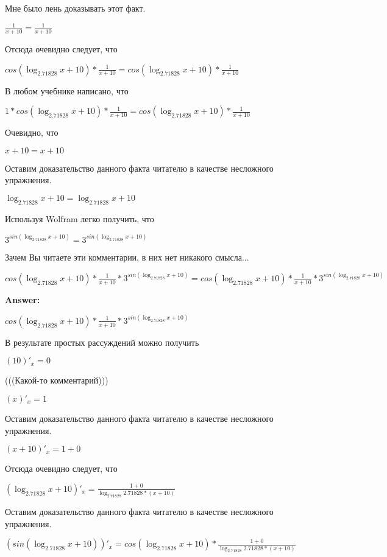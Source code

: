 \documentclass[12pt,a4paper,fleqn]{article}
\theoremstyle{definition}
\begin{document}
Мне было лень доказывать этот факт.

$\frac{ 1 }{ x  +  10 }
 = \frac{ 1 }{ x  +  10 }
$

Отсюда очевидно следует, что 

$cos(\log_{ 2.71828 }{ x  +  10 }) * \frac{ 1 }{ x  +  10 }
 = cos(\log_{ 2.71828 }{ x  +  10 }) * \frac{ 1 }{ x  +  10 }
$

В любом учебнике написано, что 

$ 1  * cos(\log_{ 2.71828 }{ x  +  10 }) * \frac{ 1 }{ x  +  10 }
 = cos(\log_{ 2.71828 }{ x  +  10 }) * \frac{ 1 }{ x  +  10 }
$

Очевидно, что 

$ x  +  10  =  x  +  10 $

Оставим доказательство данного факта читателю в качестве несложного упражнения. 

$\log_{ 2.71828 }{ x  +  10 } = \log_{ 2.71828 }{ x  +  10 }$

Используя Wolfram легко получить, что 

${ 3 }^{sin(\log_{ 2.71828 }{ x  +  10 })} = { 3 }^{sin(\log_{ 2.71828 }{ x  +  10 })}$

Зачем Вы читаете эти комментарии, в них нет никакого смысла... 

$cos(\log_{ 2.71828 }{ x  +  10 }) * \frac{ 1 }{ x  +  10 }
 * { 3 }^{sin(\log_{ 2.71828 }{ x  +  10 })} = cos(\log_{ 2.71828 }{ x  +  10 }) * \frac{ 1 }{ x  +  10 }
 * { 3 }^{sin(\log_{ 2.71828 }{ x  +  10 })}$


\textbf{Answer:}

$cos(\log_{ 2.71828 }{ x  +  10 }) * \frac{ 1 }{ x  +  10 }
 * { 3 }^{sin(\log_{ 2.71828 }{ x  +  10 })}$

В результате простых рассуждений можно получить 

$( 10 )'_{x} =  0 $

(((Какой-то комментарий))) 

$( x )'_{x} =  1 $

Оставим доказательство данного факта читателю в качестве несложного упражнения. 

$( x  +  10 )'_{x} =  1  +  0 $

Отсюда очевидно следует, что 

$(\log_{ 2.71828 }{ x  +  10 })'_{x} = \frac{ 1  +  0 }{\log_{ 2.71828 }{ 2.71828 } * ( x  +  10 )}
$

Оставим доказательство данного факта читателю в качестве несложного упражнения. 

$(sin(\log_{ 2.71828 }{ x  +  10 }))'_{x} = cos(\log_{ 2.71828 }{ x  +  10 }) * \frac{ 1  +  0 }{\log_{ 2.71828 }{ 2.71828 } * ( x  +  10 )}
$
\end{document}
